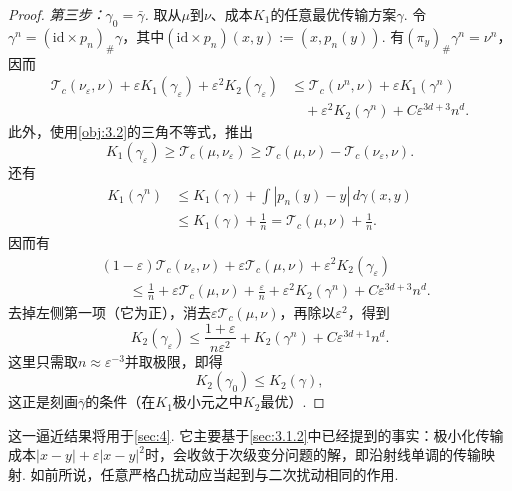 \begin{proof}
\emph{第三步：$\gamma_0=\bar\gamma$.} 取从$\mu$到$\nu$、成本$K_1$的任意最优传输方案$\gamma$. 令$\gamma^n=(\mathrm{id}\times p_n)_\#\gamma$，其中$(\mathrm{id}\times p_n)(x,y):=(x,p_n(y))$. 有$(\pi_y)_\#\gamma^n=\nu^n$，因而
\begin{equation*}
\begin{aligned}
\mathscr T_c(\nu_\varepsilon,\nu)+\varepsilon K_1(\gamma_\varepsilon)+\varepsilon^2K_2(\gamma_\varepsilon)
&\le\mathscr T_c(\nu^n,\nu)+\varepsilon K_1(\gamma^n)\\
&\quad+\varepsilon^2K_2(\gamma^n)+C\varepsilon^{3d+3}n^d.
\end{aligned}
\end{equation*}
此外，使用\autoref{obj:3.2}的三角不等式，推出
\[
K_1(\gamma_\varepsilon)\ge\mathscr T_c(\mu,\nu_\varepsilon)
\ge\mathscr T_c(\mu,\nu)-\mathscr T_c(\nu_\varepsilon,\nu).
\]
还有
\begin{equation*}
\begin{aligned}
K_1(\gamma^n)&\le K_1(\gamma)+\int|p_n(y)-y|\,d\gamma(x,y)\\
&\le K_1(\gamma)+\frac1n=\mathscr T_c(\mu,\nu)+\frac1n.
\end{aligned}
\end{equation*}
因而有
\begin{equation*}
\begin{aligned}
&(1-\varepsilon)\mathscr T_c(\nu_\varepsilon,\nu)+\varepsilon\mathscr T_c(\mu,\nu)+\varepsilon^2K_2(\gamma_\varepsilon)\\
&\qquad\le\frac1n+\varepsilon\mathscr T_c(\mu,\nu)+\frac\varepsilon n
+\varepsilon^2K_2(\gamma^n)+C\varepsilon^{3d+3}n^d.
\end{aligned}
\end{equation*}
去掉左侧第一项（它为正），消去$\varepsilon\mathscr T_c(\mu,\nu)$，再除以$\varepsilon^2$，得到
\[
K_2(\gamma_\varepsilon)\le\frac{1+\varepsilon}{n\varepsilon^2}+K_2(\gamma^n)+C\varepsilon^{3d+1}n^d.
\]
这里只需取$n\approx\varepsilon^{-3}$并取极限，即得
\[
K_2(\gamma_0)\le K_2(\gamma),
\]
这正是刻画$\bar\gamma$的条件（在$K_1$极小元之中$K_2$最优）.
\end{proof}

这一逼近结果将用于\autoref{sec:4}. 它主要基于\autoref{sec:3.1.2}中已经提到的事实：极小化传输成本$|x-y|+\varepsilon|x-y|^2$时，会收敛于次级变分问题的解，即沿射线单调的传输映射. 如前所说，任意严格凸扰动应当起到与二次扰动相同的作用.

